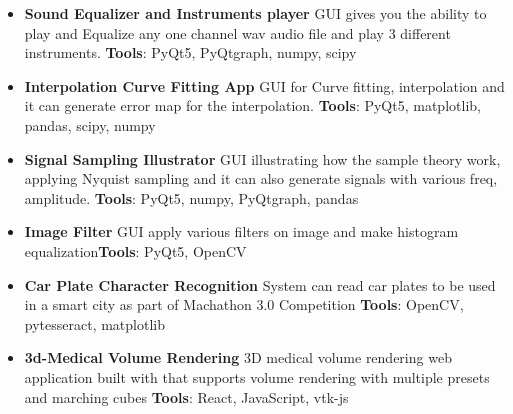 
\begin{itemize}
\item \textbf {Sound Equalizer and Instruments player} \href{https://github.com/Yasien99/Equalizer-and-Instruments-player}{ \ExternalLink}  \newline 
GUI gives you the ability to play and Equalize any one channel wav audio file and play 3 different instruments.\newline 
\textbf {Tools}: PyQt5, PyQtgraph, numpy, scipy
\smallskip
\item \textbf {Interpolation Curve Fitting App} \href{https://github.com/Yasien99/Interpolation-Curve-Fitting-App}{ \ExternalLink} \newline
GUI for Curve fitting, interpolation and it can generate error map for the interpolation.
\newline \textbf {Tools}: PyQt5, matplotlib, pandas, scipy, numpy
\smallskip
\item \textbf {Signal Sampling Illustrator} \href{https://github.com/Yasien99/Sampling-Theory-Illustrator}{ \ExternalLink} \newline
GUI illustrating how the sample theory work, applying Nyquist sampling and it can also generate signals with various freq, amplitude.
\newline \textbf {Tools}: PyQt5, numpy, PyQtgraph, pandas
\smallskip
\end{itemize}
\smallskip

\begin{itemize}
\item \textbf {Image Filter} \href{https://github.com/Yasien99/Img-Filter}{ \ExternalLink} \newline GUI apply various filters on image and make histogram equalization\newline \textbf {Tools}: PyQt5, OpenCV
\smallskip
\item \textbf {Car Plate Character Recognition} \href{https://github.com/Yasien99/OCR-Applications}{ \ExternalLink}\newline System can read car plates to be used in a smart city as part of Machathon 3.0 Competition \newline \textbf {Tools}: OpenCV, pytesseract, matplotlib
\smallskip
\end{itemize}
\smallskip

\begin{itemize}
\item  \textbf {3d-Medical Volume Rendering} \href{https://github.com/Yasien99/3d-Medical_Volume_Rendering}{ \ExternalLink} \newline 
3D medical volume rendering web application built with that
supports volume rendering with multiple presets and marching
cubes \newline \textbf {Tools}:
React, JavaScript, vtk-js
\smallskip
\end{itemize}



